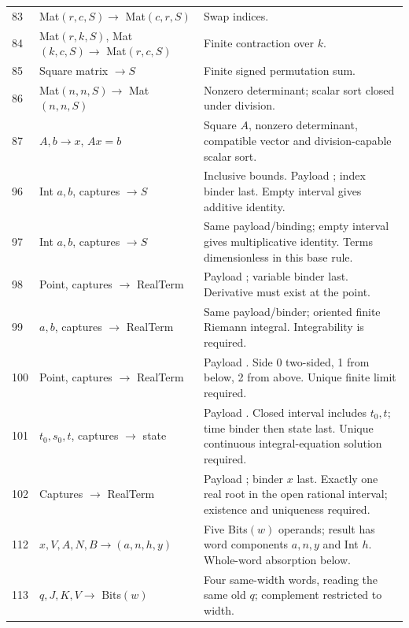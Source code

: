 {\begin{longtable}{@{}P{.23\linewidth}P{.24\linewidth}P{.48\linewidth}@{}}
83  & Mat$(r,c,S)\to$ Mat$(c,r,S)$ & Swap indices.\\
84  & Mat$(r,k,S)$, Mat$(k,c,S)\to$ Mat$(r,c,S)$ & Finite contraction over $k$.\\
85  & Square matrix $\to S$ & Finite signed permutation sum.\\
86  & Mat$(n,n,S)\to$ Mat$(n,n,S)$ & Nonzero determinant; scalar sort closed under division.\\
87  & $A,b\to x$, $Ax=b$ & Square $A$, nonzero determinant, compatible vector and division-capable scalar sort.\\
96  & Int $a,b$, captures $\to S$ & Inclusive bounds. Payload ; index binder last. Empty interval gives additive identity.\\
97  & Int $a,b$, captures $\to S$ & Same payload/binding; empty interval gives multiplicative identity. Terms dimensionless in this base rule.\\
98  & Point, captures $\to$ RealTerm & Payload ; variable binder last. Derivative must exist at the point.\\
99  & $a,b$, captures $\to$ RealTerm & Same payload/binder; oriented finite Riemann integral. Integrability is required.\\
100  & Point, captures $\to$ RealTerm & Payload . Side 0 two-sided, 1 from below, 2 from above. Unique finite limit required.\\
101  & $t_0,s_0,t$, captures $\to$ state & Payload . Closed interval includes $t_0,t$; time binder then state last. Unique continuous integral-equation solution required.\\
102  & Captures $\to$ RealTerm & Payload ; binder $x$ last. Exactly one real root in the open rational interval; existence and uniqueness required.\\
112  & $x,V,A,N,B\to(a,n,h,y)$ & Five Bits$(w)$ operands; result has word components $a,n,y$ and Int $h$. Whole-word absorption below.\\
113  & $q,J,K,V\to$ Bits$(w)$ & Four same-width words, reading the same old $q$; complement restricted to width.\\
\end{longtable}}


